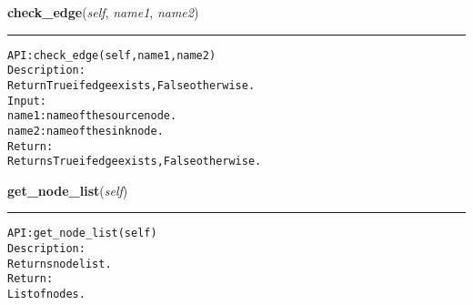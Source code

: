     \label{coinor:gimpy:graph:Graph:check_edge}

    \vspace{0.5ex}

\hspace{.8\funcindent}\begin{boxedminipage}{\funcwidth}

    \raggedright \textbf{check\_edge}(\textit{self}, \textit{name1}, \textit{name2})

    \vspace{-1.5ex}

    \rule{\textwidth}{0.5\fboxrule}
\setlength{\parskip}{2ex}
\begin{alltt}

API: check\_edge(self, name1, name2)
Description:
Return True if edge exists, False otherwise.
Input:
    name1: name of the source node.
    name2: name of the sink node.
Return:
    Returns True if edge exists, False otherwise.
\end{alltt}

\setlength{\parskip}{1ex}
    \end{boxedminipage}

    \label{coinor:gimpy:graph:Graph:get_node_list}

    \vspace{0.5ex}

\hspace{.8\funcindent}\begin{boxedminipage}{\funcwidth}

    \raggedright \textbf{get\_node\_list}(\textit{self})

    \vspace{-1.5ex}

    \rule{\textwidth}{0.5\fboxrule}
\setlength{\parskip}{2ex}
\begin{alltt}

API: get\_node\_list(self)
Description:
Returns node list.
Return:
    List of nodes.
\end{alltt}

\setlength{\parskip}{1ex}
    \end{boxedminipage}

